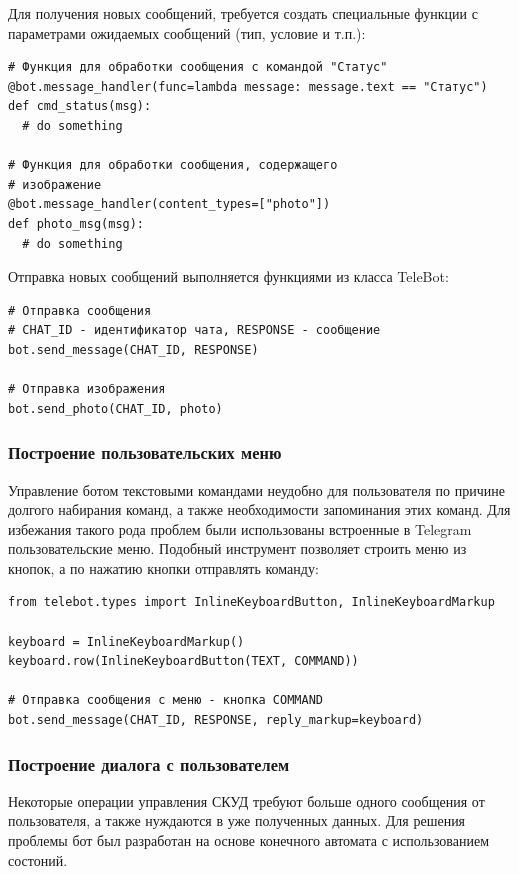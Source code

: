 Для получения новых сообщений, требуется создать специальные функции
с параметрами ожидаемых сообщений (тип, условие и т.п.):

\begin{lstlisting}
# Функция для обработки сообщения с командой "Статус" 
@bot.message_handler(func=lambda message: message.text == "Статус")
def cmd_status(msg):
  # do something

# Функция для обработки сообщения, содержащего
# изображение
@bot.message_handler(content_types=["photo"])
def photo_msg(msg):
  # do something
\end{lstlisting}

Отправка новых сообщений выполняется функциями из класса TeleBot:

\begin{lstlisting}
# Отправка сообщения
# CHAT_ID - идентификатор чата, RESPONSE - сообщение
bot.send_message(CHAT_ID, RESPONSE)

# Отправка изображения
bot.send_photo(CHAT_ID, photo)
\end{lstlisting}

\subsubsection{Построение пользовательских меню} 

Управление ботом текстовыми командами неудобно для пользователя по причине
долгого набирания команд, а также необходимости запоминания этих команд. Для
избежания такого рода проблем были использованы встроенные в Telegram
пользовательские меню. Подобный инструмент позволяет строить меню из кнопок,
а по нажатию кнопки отправлять команду:

\begin{lstlisting}
from telebot.types import InlineKeyboardButton, InlineKeyboardMarkup

keyboard = InlineKeyboardMarkup() 
keyboard.row(InlineKeyboardButton(TEXT, COMMAND))

# Отправка сообщения с меню - кнопка COMMAND
bot.send_message(CHAT_ID, RESPONSE, reply_markup=keyboard)
\end{lstlisting}

\subsubsection{Построение диалога с пользователем}

Некоторые операции управления СКУД требуют больше одного сообщения от
пользователя, а также нуждаются в уже полученных данных. Для решения проблемы
бот был разработан на основе конечного автомата с использованием состоний. 


